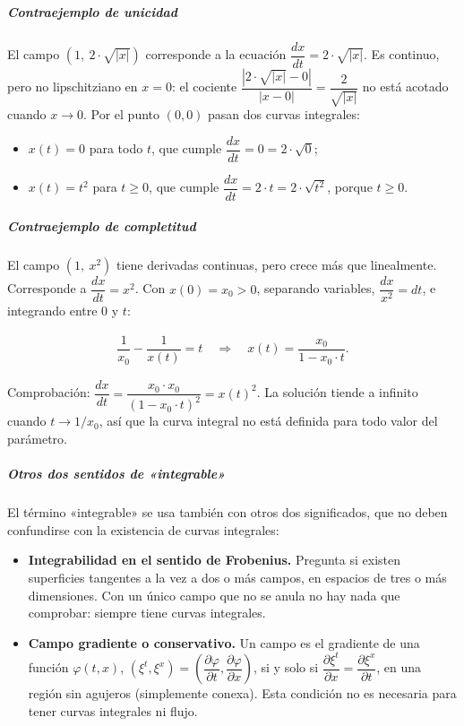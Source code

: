 \documentclass[
  spanish,
]{article}
\providecommand{\tightlist}{%
  \setlength{\itemsep}{0pt}\setlength{\parskip}{0pt}}
\begin{document}
\subparagraph{Contraejemplo de
unicidad}\label{contraejemplo-de-unicidad}

El campo \((1,\ 2 \cdot \sqrt{|x|})\) corresponde a la ecuación
\(\dfrac{dx}{dt} = 2 \cdot \sqrt{|x|}\). Es continuo, pero no
lipschitziano en \(x = 0\): el cociente
\(\dfrac{|2 \cdot \sqrt{|x|} - 0|}{|x - 0|} = \dfrac{2}{\sqrt{|x|}}\) no
está acotado cuando \(x \to 0\). Por el punto \((0, 0)\) pasan dos
curvas integrales:

\begin{itemize}
\tightlist
\item
  \(x(t) = 0\) para todo \(t\), que cumple
  \(\dfrac{dx}{dt} = 0 = 2 \cdot \sqrt{0}\);
\item
  \(x(t) = t^2\) para \(t \ge 0\), que cumple
  \(\dfrac{dx}{dt} = 2 \cdot t = 2 \cdot \sqrt{t^2}\), porque
  \(t \ge 0\).
\end{itemize}

\subparagraph{Contraejemplo de
completitud}\label{contraejemplo-de-completitud}

El campo \((1,\ x^2)\) tiene derivadas continuas, pero crece más que
linealmente. Corresponde a \(\dfrac{dx}{dt} = x^2\). Con
\(x(0) = x_0 > 0\), separando variables, \(\dfrac{dx}{x^2} = dt\), e
integrando entre \(0\) y \(t\):

\[
\begin{aligned}
\dfrac{1}{x_0} - \dfrac{1}{x(t)} = t
\quad \Longrightarrow \quad
x(t) = \dfrac{x_0}{1 - x_0 \cdot t}.
\end{aligned}
\]

Comprobación:
\(\dfrac{dx}{dt} = \dfrac{x_0 \cdot x_0}{(1 - x_0 \cdot t)^2} = x(t)^2\).
La solución tiende a infinito cuando \(t \to 1/x_0\), así que la curva
integral no está definida para todo valor del parámetro.

\subparagraph{Otros dos sentidos de
«integrable»}\label{otros-dos-sentidos-de-integrable}

El término «integrable» se usa también con otros dos significados, que
no deben confundirse con la existencia de curvas integrales:

\begin{itemize}
\tightlist
\item
  \textbf{Integrabilidad en el sentido de Frobenius.} Pregunta si
  existen superficies tangentes a la vez a dos o más campos, en espacios
  de tres o más dimensiones. Con un único campo que no se anula no hay
  nada que comprobar: siempre tiene curvas integrales.
\item
  \textbf{Campo gradiente o conservativo.} Un campo es el gradiente de
  una función \(\varphi(t, x)\),
  \((\xi^t, \xi^x) = \left(\dfrac{\partial \varphi}{\partial t}, \dfrac{\partial \varphi}{\partial x}\right)\),
  si y solo si
  \(\dfrac{\partial \xi^t}{\partial x} = \dfrac{\partial \xi^x}{\partial t}\),
  en una región sin agujeros (simplemente conexa). Esta condición no es
  necesaria para tener curvas integrales ni flujo.
\end{itemize}
\end{document}
